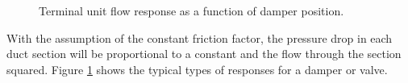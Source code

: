 \begin{figure}
\centering
{}
\caption{Terminal unit flow response as a function of damper position.}
\label{fig:flowVersusDamperPos}
\end{figure}



With the assumption of the constant friction factor, the pressure drop
in each duct section will be proportional to a constant and the flow
through the section squared. Figure \ref{fig:flowVersusDamperPos} shows
the typical types of responses for a damper or valve.

